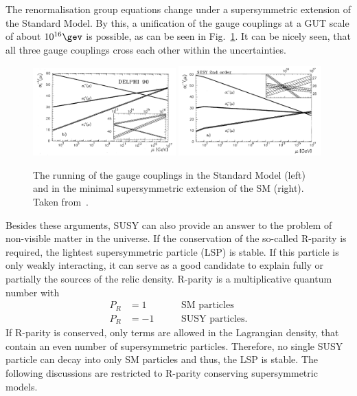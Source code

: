 The renormalisation group equations change under a supersymmetric extension of the Standard Model.
By this, a unification of the gauge couplings at a GUT scale of about $10^{16}\gev$ is possible, as can be seen in Fig.~\ref{fig:Unification}.
It can be nicely seen, that all three gauge couplings cross each other within the uncertainties.
\begin{figure}[!t]
  \centering
      \includegraphics[width=0.49\textwidth]{figures/theory/running_couplings_SM}
      \includegraphics[width=0.49\textwidth]{figures/theory/running_couplings_MSSM}
  \caption{The running of the gauge couplings in the Standard Model (left) and in the minimal supersymmetric extension of the SM (right). Taken from~\cite{bib:Unification}.}  
  \label{fig:Unification}
\end{figure}

Besides these arguments, SUSY can also provide an answer to the problem of non-visible matter in the universe.
If the conservation of the so-called R-parity is required, the lightest supersymmetric particle (LSP) is stable.
If this particle is only weakly interacting, it can serve as a good candidate to explain fully or partially the sources of the relic density. 
R-parity is a multiplicative quantum number with 
\begin{equation}
\begin{aligned}
P_R & =  1 \qquad &&\text{SM particles}\\
P_R & = -1 &&\text{SUSY particles}.
\end{aligned}
\end{equation}
If R-parity is conserved, only terms are allowed in the Lagrangian density, that contain an even number of supersymmetric particles.
Therefore, no single SUSY particle can decay into only SM particles and thus, the LSP is stable.
The following discussions are restricted to R-parity conserving supersymmetric models.



